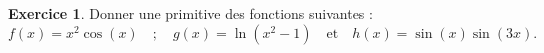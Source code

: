 \documentclass[a4paper, 11pt,openany]{article}%
\theoremstyle{plain}
\theoremstyle{definition}
\newtheorem{exo}{Exercice}
\newtheorem{sol}{Solution de l'exercice}
\theoremstyle{remark}
\begin{document}
\begin{exo}
Donner une primitive des fonctions suivantes :
\[ f(x) = x^2 \cos(x) \quad ; \quad g(x) = \ln(x^2 - 1) \quad \text{et} \quad h(x) = \sin(x) \sin(3x).\]
\end{exo}
%
\end{document}
